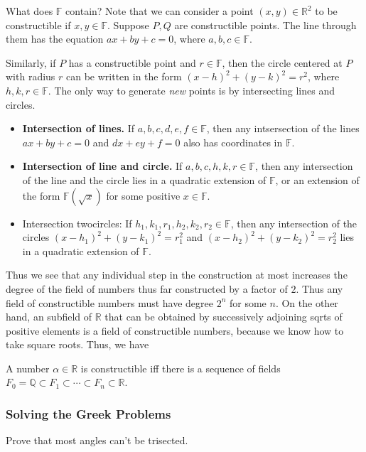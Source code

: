 \documentclass{scrartcl}
\begin{document}
What does $\mathbb{F}$ contain? Note that we can consider a point $(x, y) \in \mathbb{R}^2$ to be constructible if $x,y \in \mathbb{F}$. Suppose $P, Q$ are constructible points. The line through them has the equation $ax+by+c=0$, where $a,b,c \in \mathbb{F}$.

Similarly, if $P$ has a constructible point and $r \in \mathbb{F}$, then the circle centered at $P$ with radius $r$ can be written in the form $(x-h)^2 + (y-k)^2 = r^2$, where $h,k,r \in \mathbb{F}$. The only way to generate \textit{new} points is by intersecting lines and circles.

\begin{itemize}
	\item \textbf{Intersection of lines.} If $a,b,c,d,e,f \in \mathbb{F}$, then any intsersection of the lines $ax+by+c = 0$ and $dx+ey+f = 0$ also has coordinates in $\mathbb{F}$. 
	\item \textbf{Intersection of line and circle.} If $a,b,c,h,k,r \in \mathbb{F}$, then any intersection of the line and the circle lies in a quadratic extension of $\mathbb{F}$, or an extension of the form $\mathbb{F}(\sqrt{x})$ for some positive $x \in \mathbb{F}$. 
	\item Intersection twocircles: If $h_1, k_1, r_1, h_2, k_2, r_2 \in \mathbb{F}$, then any intersection of the circles $(x-h_1)^2 + (y-k_1)^2 = r_1^2$ and $(x-h_2)^2 + (y-k_2)^2 = r_2^2$ lies in a quadratic extension of $\mathbb{F}$.
\end{itemize}

Thus we see that any individual step in the construction at most increases the degree of the field of numbers thus far constructed by a factor of $2$. Thus any field of constructible numbers must have degree $2^n$ for some $n$. On the other hand, an subfield of $\mathbb{R}$ that can be obtained by successively adjoining sqrts of positive elements is a field of constructible numbers, because we know how to take square roots. Thus, we have

\begin{theorem}
	A number $\alpha \in \mathbb{R}$ is constructible iff there is a sequence of fields $F_0 = \mathbb{Q} \subset F_1 \subset \cdots \subset F_n \subset \mathbb{R}$.
\end{theorem}

\subsubsection{Solving the Greek Problems}
\begin{problem}
	Prove that most angles can't be trisected.
\end{problem}
\end{document}
